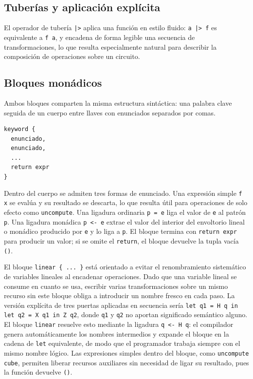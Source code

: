 \subsection{Tuberías y aplicación explícita}

El operador de tubería \lstinline{|>} aplica una función en estilo fluido: \lstinline{a |> f} es equivalente a \lstinline|f a|, y encadena de forma legible una secuencia de transformaciones, lo que resulta especialmente natural para describir la composición de operaciones sobre un circuito.

\subsection{Bloques monádicos}
\label{sec:linear}

Ambos bloques comparten la misma estructura sintáctica: una palabra clave seguida de un cuerpo entre llaves con enunciados separados por comas.

\begin{lstlisting}[language={}, caption=Estructura genérica de un bloque monádico]
keyword {
  enunciado,
  enunciado,
  ...
  return expr
}
\end{lstlisting}

Dentro del cuerpo se admiten tres formas de enunciado. Una expresión simple \lstinline|f x| se evalúa y su resultado se descarta, lo que resulta útil para operaciones de solo efecto como \lstinline|uncompute|. Una ligadura ordinaria \lstinline|p = e| liga el valor de \lstinline|e| al patrón \lstinline|p|. Una ligadura monádica \lstinline|p <- e| extrae el valor del interior del envoltorio lineal o monádico producido por \lstinline|e| y lo liga a \lstinline|p|. El bloque termina con \lstinline|return expr| para producir un valor; si se omite el \lstinline|return|, el bloque devuelve la tupla vacía \lstinline|()|.

El bloque \lstinline|linear { ... }| está orientado a evitar el renombramiento sistemático de variables lineales al encadenar operaciones. Dado que una variable lineal se consume en cuanto se usa, escribir varias transformaciones sobre un mismo recurso sin este bloque obliga a introducir un nombre fresco en cada paso. La versión explícita de tres puertas aplicadas en secuencia sería \lstinline|let q1 = H q in let q2 = X q1 in Z q2|, donde \lstinline|q1| y \lstinline|q2| no aportan significado semántico alguno. El bloque \lstinline|linear| resuelve esto mediante la ligadura \lstinline|q <- H q|: el compilador genera automáticamente los nombres intermedios y expande el bloque en la cadena de \lstinline|let| equivalente, de modo que el programador trabaja siempre con el mismo nombre lógico. Las expresiones simples dentro del bloque, como \lstinline|uncompute cube|, permiten liberar recursos auxiliares sin necesidad de ligar su resultado, pues la función devuelve \lstinline|()|.

